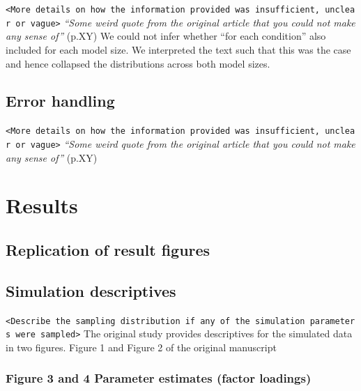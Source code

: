 \documentclass[10,a4paperpaper,]{article}
\begin{document}
\texttt{\textless{}More\ details\ on\ how\ the\ information\ provided\ was\ insufficient,\ unclear\ or\ vague\textgreater{}}
\emph{``Some weird quote from the original article that you could not
make any sense of''} (p.XY) We could not infer whether ``for each
condition'' also included for each model size. We interpreted the text
such that this was the case and hence collapsed the distributions across
both model sizes.

\subsection{Error handling}

\texttt{\textless{}More\ details\ on\ how\ the\ information\ provided\ was\ insufficient,\ unclear\ or\ vague\textgreater{}}
\emph{``Some weird quote from the original article that you could not
make any sense of''} (p.XY)

\section{Results}

\subsection{Replication of result figures}
\subsection{Simulation descriptives}

\texttt{\textless{}Describe\ the\ sampling\ distribution\ if\ any\ of\ the\ simulation\ parameters\ were\ sampled\textgreater{}}
The original study provides descriptives for the simulated data in two
figures. Figure 1 and Figure 2 of the original manuscript

\subsubsection{Figure 3 and 4 Parameter estimates (factor loadings)}
\end{document}
